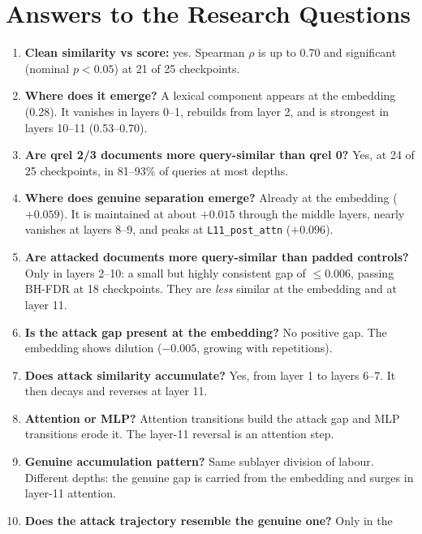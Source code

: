 \documentclass[11pt]{article}
\begin{document}
\section{Answers to the Research Questions}

\begin{enumerate}[leftmargin=*]
  \item \textbf{Clean similarity vs score:} yes. Spearman $\rho$ is up to 0.70 and
        significant (nominal $p<0.05$) at 21 of 25 checkpoints.
  \item \textbf{Where does it emerge?} A lexical component appears at the embedding
        (0.28). It vanishes in layers 0--1, rebuilds from layer 2, and is strongest in
        layers 10--11 (0.53--0.70).
  \item \textbf{Are qrel 2/3 documents more query-similar than qrel 0?} Yes, at 24 of
        25 checkpoints, in 81--93\% of queries at most depths.
  \item \textbf{Where does genuine separation emerge?} Already at the embedding
        ($+0.059$). It is maintained at about $+0.015$ through the middle layers,
        nearly vanishes at layers 8--9, and peaks at \texttt{L11\_post\_attn}
        ($+0.096$).
  \item \textbf{Are attacked documents more query-similar than padded controls?} Only
        in layers 2--10: a small but highly consistent gap of $\le0.006$, passing
        BH-FDR at 18 checkpoints. They are \emph{less} similar at the embedding and at
        layer 11.
  \item \textbf{Is the attack gap present at the embedding?} No positive gap. The
        embedding shows dilution ($-0.005$, growing with repetitions).
  \item \textbf{Does attack similarity accumulate?} Yes, from layer 1 to layers 6--7.
        It then decays and reverses at layer 11.
  \item \textbf{Attention or MLP?} Attention transitions build the attack gap and MLP
        transitions erode it. The layer-11 reversal is an attention step.
  \item \textbf{Genuine accumulation pattern?} Same sublayer division of labour.
        Different depths: the genuine gap is carried from the embedding and surges in
        layer-11 attention.
  \item \textbf{Does the attack trajectory resemble the genuine one?} Only in the

\end{enumerate}
\end{document}

